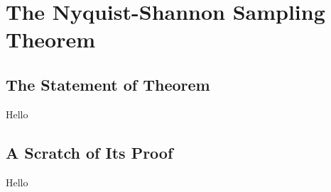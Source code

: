\chapter{The Nyquist-Shannon Sampling Theorem}

\section{The Statement of Theorem}
Hello

\section{A Scratch of Its Proof}
Hello
